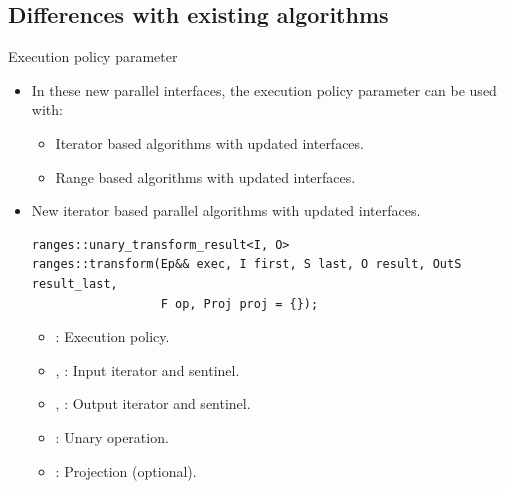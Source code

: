 \subsection{Differences with existing algorithms}

\begin{frame}[t,fragile]{Execution policy parameter}
\begin{itemize}

  \item In these new parallel interfaces, the execution policy parameter can be used with:
     \begin{itemize}
        \item Iterator based algorithms with updated interfaces.
        \item Range based algorithms with updated interfaces.
    \end{itemize}
    
  \item New iterator based parallel algorithms with updated interfaces.

\begin{lstlisting}
ranges::unary_transform_result<I, O>
ranges::transform(Ep&& exec, I first, S last, O result, OutS result_last,
                  F op, Proj proj = {});
\end{lstlisting}

  \begin{itemize}
    \item {}: Execution policy.
    \item {}, : Input iterator and sentinel.
    \item {}, : Output iterator and sentinel.
    \item {}: Unary operation.
    \item {}: Projection (optional).
  \end{itemize}
  
\end{itemize}
\end{frame}

